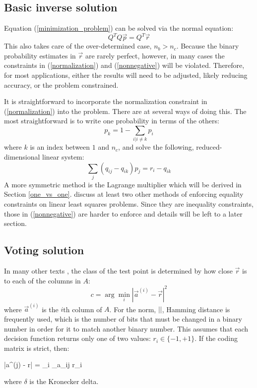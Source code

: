 \subsection{Basic inverse solution}

Equation (\ref{minimization_problem}) can be solved via the normal
equation:
\begin{equation}
	Q^T Q \vec p = Q^T \vec r
	\label{normal_equation}
\end{equation}
This also takes care of the over-determined case, $n_b > n_c$.
Because the binary probability estimates in $\vec r$ are rarely perfect, however,
in many cases the constraints in (\ref{normalization}) and (\ref{nonnegative}) will be violated. 
Therefore, for most applications, either the results will need to be adjusted, likely reducing accuracy, or the problem constrained.

It is straightforward to incorporate the normalization constraint in (\ref{normalization}) into the problem. 
There are at several ways of doing this. The most
straightforward is to write one probability in terms of the others:
\begin{equation}
	p_k = 1 - \sum_{i|i \ne k} p_i
	\label{reduce_dimension1}
\end{equation}
where $k$ is an index between $1$ and $n_c$,
and solve the following, reduced-dimensional linear system:
\begin{equation}
	\sum_j (q_{ij} - q_{ik} ) p_j = r_i - q_{ik}
	\label{reduce_dimension2}
\end{equation}
A more symmetric method is the Lagrange multiplier which will be
derived in Section \ref{one_vs_one}.
\citet{Lawson_Hanson1995} discuss at least two other methods of
enforcing equality constraints on linear least squares problems.
Since they are inequality constraints, those in (\ref{nonnegative}) are
harder to enforce and details  will be left to a later section.

\subsection{Voting solution}

In many other texts \citep{Allwein_etal2000,Hsu_Lin2002,Dietterich_Bakiri1995},
the class of the test point is determined by how close $\vec r$
is to each of the columns in $A$:
\begin{equation}
	c = \arg \min_i |\vec a^{(i)} - \vec r|^2
	\label{distance_based_decoding}
\end{equation}
where $\vec a^{(i)}$ is the $i$th column of $A$.
For the norm, $||$, Hamming distance is
frequently used, which is the number of bits that must be changed
in a binary number in order for it to match another binary number.
This assumes that each decision function returns only one of two values: 
$r_i \in \lbrace -1, +1 \rbrace$.
If the coding matrix is strict, then:
\begin{eqnnon}
	|\vec a^{(j)} - \vec r| = \sum_i \delta_{a_{ij} r_i}
\end{eqnnon}
where $\delta$ is the Kronecker delta.


